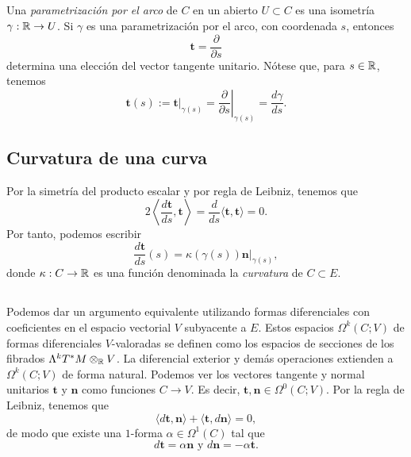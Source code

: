 \documentclass[11pt,a4paper]{amsbook}
\theoremstyle{remark} \newtheorem{rmk}[subsection]{Observación}
\theoremstyle{definition} \newtheorem{defn}[subsection]{Definición}
\theoremstyle{definition} \newtheorem{ex}[subsection]{Ejemplo}
\theoremstyle{definition} \newtheorem{ej}[subsection]{Ejercicio}
\begin{document}
\subsection{} Una \emph{parametrización por el arco} de $C$ en un abierto $U\subset C$ es una isometría $\gamma:\mathbb R\rightarrow U$. Si $\gamma$ es una parametrización por el arco, con coordenada $s$, entonces
\begin{equation*}
\bm{t} = \frac{\partial}{\partial s}
\end{equation*}
determina una elección del vector tangente unitario. Nótese que, para $s\in \mathbb R$, tenemos
\begin{equation*}
\bm{t}(s):= \bm{t}|_{\gamma(s)} = \left. \frac{\partial}{\partial s} \right|_{\gamma(s)} = \frac{d\gamma}{ds}.
\end{equation*}

\subsection{Curvatura de una curva}
Por la simetría del producto escalar y por regla de Leibniz, tenemos que
\begin{equation*}
2\left \langle \frac{d\bm{t}}{ds}, \bm{t} \right \rangle = \frac{d}{ds} \langle \bm{t},\bm{t}\rangle = 0.
\end{equation*}
Por tanto, podemos escribir
\begin{equation*}
\frac{d\bm{t}}{ds}(s) = \kappa(\gamma(s)) \bm{n}|_{\gamma(s)},
\end{equation*}
donde $\kappa:C\rightarrow \mathbb R$ es una función denominada la \emph{curvatura} de $C\subset E$.

\subsection{} Podemos dar un argumento equivalente utilizando formas diferenciales con coeficientes en el espacio vectorial $V$ subyacente a $E$. Estos espacios $\Omega^k(C;V)$ de formas diferenciales $V$-valoradas se definen como los espacios de secciones de los fibrados $\Lambda^k T^*M \otimes_{\mathbb R} V$. La diferencial exterior y demás operaciones extienden a $\Omega^k(C;V)$ de forma natural. Podemos ver los vectores tangente y normal unitarios $\bm{t}$ y $\bm{n}$ como funciones $C\rightarrow V$. Es decir, $\bm{t},\bm{n}\in \Omega^0(C;V)$. Por la regla de Leibniz, tenemos que
\begin{equation*}
\langle d \bm{t},\bm{n}\rangle + \langle\bm{t},d\bm{n} \rangle = 0,
\end{equation*}
de modo que existe una $1$-forma $\alpha \in \Omega^1(C)$ tal que
\begin{equation*}
d\bm{t} = \alpha \bm{n} \text{ y } d\bm{n} = -\alpha \bm{t}.
\end{equation*}
\end{document}
